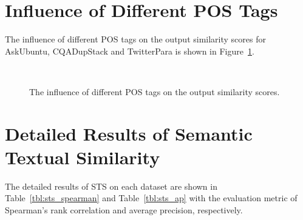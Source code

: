 \documentclass[11pt,a4paper]{article}
\begin{document}
\section{Influence of Different POS Tags}
\label{sec:pos_tags}
The influence of different POS tags on the output similarity scores for AskUbuntu, CQADupStack and TwitterPara is shown in Figure~\ref{fig:pos_tags_influence}.

\begin{figure}[H]
  \centering
   \\
  \caption{The influence of different POS tags on the output similarity scores.}
  \label{fig:pos_tags_influence}
\end{figure}

\section{Detailed Results of Semantic Textual Similarity}
\label{sec:detailed_sts}

The detailed results of STS on each dataset are shown in Table~\ref{tbl:sts_spearman} and Table~\ref{tbl:sts_ap} with the evaluation metric of Spearman's rank correlation and average precision, respectively.
\end{document}
